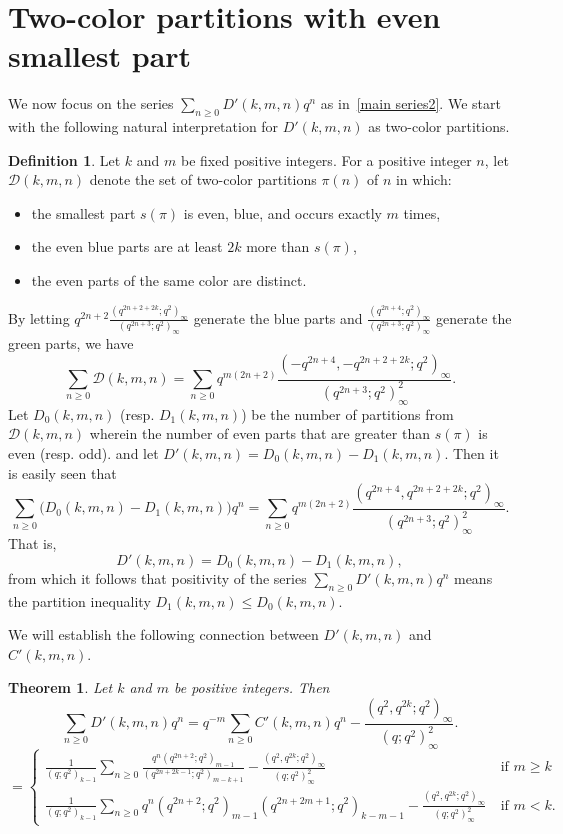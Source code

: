 \documentclass[reqno]{amsart}
\theoremstyle{definition}
\newtheorem{definition}{Definition}
\theoremstyle{plain}
\newtheorem{theorem}    {Theorem}
\theoremstyle{remark}
\numberwithin{equation}{section}
\newcommand{\fr}{\frac}
\begin{document}
\section{Two-color partitions with even smallest part}\label{sec even-spt}
%
We now focus on the series $\sum_{n\geq 0}D'(k,m,n)q^n$ as in~\eqref{main series2}.
We start with the following natural interpretation for $D'(k,m,n)$ as two-color partitions.
\begin{definition}
Let $k$ and $m$ be fixed positive integers. For a positive integer $n$, let $\mathcal{D}(k,m,n)$ denote the set of two-color partitions $\pi(n)$ of $n$
in which:
\begin{itemize}
\item the smallest part $s(\pi)$ is even, blue, and occurs exactly $m$ times,
\item the even blue parts are at least $2k$ more than $s(\pi)$,
\item the even parts of the same color are distinct.
\end{itemize}
By letting $q^{2n+2}\fr{(q^{2n+2+2k};q^2)_\infty}{(q^{2n+3};q^2)_\infty}$ generate the blue parts and
$\fr{(q^{2n+4};q^2)_\infty}{(q^{2n+3};q^2)_\infty}$ generate the green parts, we have
\[
\sum_{n\geq 0} \mathcal{D}(k,m,n)
=\sum_{n\geq 0} q^{m(2n+2)} \fr{(-q^{2n+4},-q^{2n+2+2k};q^2)_\infty}{(q^{2n+3};q^2)_\infty^2}.
\]
Let $D_0(k,m,n)$ (resp. $D_1(k,m,n)$) be the
number of partitions from $\mathcal{D}(k,m,n)$ wherein the number of even parts that are greater than $s(\pi)$ is even (resp. odd).
and let $D'(k,m,n)= D_0(k,m,n)-D_1(k,m,n)$.
Then it is easily seen that
\begin{equation}\label{gen D'}
\sum_{n\geq 0}  \big( D_0(k,m,n)-D_1(k,m,n) \big) q^n = \sum_{n\geq 0} q^{m(2n+2)} \fr{(q^{2n+4},q^{2n+2+2k};q^2)_\infty}{(q^{2n+3};q^2)_\infty^2}.
\end{equation}
That is,
\[
D'(k,m,n)= D_0(k,m,n)-D_1(k,m,n),
\]
from which it follows that positivity of the series $\sum_{n\geq 0} D'(k,m,n) q^n$ means the partition inequality
$D_1(k,m,n) \leq D_0(k,m,n)$.
\end{definition}
We will establish the following connection between $D'(k,m,n)$ and $C'(k,m,n)$.
\begin{theorem}\label{thm D'}
Let $k$ and $m$ be positive integers. Then
\[
\sum_{n\geq 0}D'(k,m,n) q^n
= q^{-m}\sum_{n\geq 0}C'(k,m,n) q^n -\fr{(q^2,q^{2k};q^2)_\infty}{(q;q^2)_\infty^2}.
\]
\[
=\begin{cases}
\fr{1}{(q;q^2)_{k-1}} \displaystyle \sum_{n\geq 0}\fr{q^n (q^{2n+2};q^2)_{m-1}}{(q^{2n+2k-1};q^2)_{m-k+1}}
-\fr{(q^2,q^{2k};q^2)_\infty}{(q;q^2)_\infty^2}
&\ \text{if $m\geq k$} \\
\fr{1}{(q;q^2)_{k-1}} \displaystyle \sum_{n\geq 0} q^n (q^{2n+2};q^2)_{m-1}(q^{2n+2m+1};q^2)_{k-m-1}
-\fr{(q^2,q^{2k};q^2)_\infty}{(q;q^2)_\infty^2}
&\ \text{if $m<k$}.
\end{cases}
\]
\end{theorem}
\end{document}
